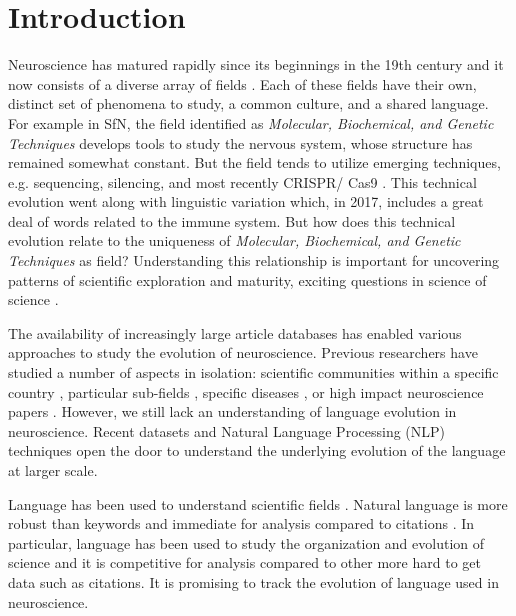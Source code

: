 \documentclass[10pt,letterpaper]{article}
\begin{document}
\linenumbers

\section*{Introduction}
Neuroscience has matured rapidly since its beginnings in the 19th century \cite{wickens2014history} and it now consists of a diverse array of fields \cite{shulman2013brain}. Each of these fields have their own, distinct set of phenomena to study, a common culture, and a shared language. For example in SfN, the field identified as \textit{Molecular, Biochemical, and Genetic Techniques} develops tools to study the nervous system, whose structure has remained somewhat constant. But the field tends to utilize emerging techniques, e.g. sequencing, silencing, and most recently CRISPR/ Cas9 \cite{doudna2014new}. This technical evolution went along with linguistic variation which, in 2017, includes a great deal of words related to the immune system. But how does this technical evolution relate to the uniqueness of \textit{Molecular, Biochemical, and Genetic Techniques} as field? Understanding this relationship is important for uncovering patterns of scientific exploration and maturity, exciting questions in science of science \cite{fortunato2018science, evans2011metaknowledge}.


The availability of increasingly large article databases has enabled various approaches to study the evolution of neuroscience. Previous researchers have studied a number of aspects in isolation: scientific communities within a specific country \cite{bala2010mapping, glanzel2003decline, persson2004decomposing, xu2003neuroscience}, particular sub-fields \cite{robins1999empirical, li2008bibliometric, bruer2010can, robert2010evolution, yeung2017bibliometric}, specific diseases \cite{bishop2010neurodevelopmental}, or high impact neuroscience papers \cite{yeung2017leading}. However, we still lack an understanding of language evolution in neuroscience. Recent datasets and Natural Language Processing (NLP) techniques \cite{gerlach2016similarity} open the door to understand the underlying evolution of the language at larger scale.

Language has been used to understand scientific fields \cite{dias2017using}. Natural language is more robust \cite{chavalarias2010science} than keywords \cite{chang2015evolution, chavalarias2013phylomemetic, yeung2017changing} and immediate for analysis compared to citations \cite{kuhn2014inheritance, herrera2010mapping, porter2009science}. In particular, language has been used to study the organization and evolution of science \cite{dias2017using} and it is competitive for analysis compared to other more hard to get data such as citations. It is promising to track the evolution of language used in neuroscience.
\end{document}
